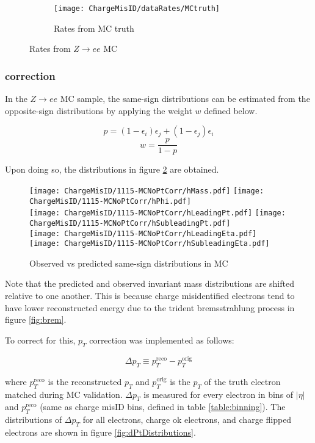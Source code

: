 \begin{figure}[h]
\ContinuedFloat
\centering
\begin{subfigure}[t]{\textwidth}
\centering
\texttt{[image: ChargeMisID/dataRates/MCtruth]}
\caption{Rates from MC truth}
\end{subfigure}
\caption{Rates from $Z\rightarrow ee$ MC}
\label{fig:2DMC}
\end{figure}

\FloatBarrier
\subsubsection*{\pT correction}
In the $Z\rightarrow ee$ MC sample, the same-sign distributions can be estimated from the opposite-sign distributions by applying the weight $w$ defined below.

$$p =(1-\epsilon_i)\epsilon_j + (1-\epsilon_j)\epsilon_i$$
$$w = \frac{p}{1-p}$$

Upon doing so, the distributions in figure \ref{fig:MCdistNoPT} are obtained.

\begin{figure}[h]
\centering
\texttt{[image: ChargeMisID/1115-MCNoPtCorr/hMass.pdf]}
\texttt{[image: ChargeMisID/1115-MCNoPtCorr/hPhi.pdf]}\\
\texttt{[image: ChargeMisID/1115-MCNoPtCorr/hLeadingPt.pdf]}
\texttt{[image: ChargeMisID/1115-MCNoPtCorr/hSubleadingPt.pdf]}\\
\texttt{[image: ChargeMisID/1115-MCNoPtCorr/hLeadingEta.pdf]}
\texttt{[image: ChargeMisID/1115-MCNoPtCorr/hSubleadingEta.pdf]}
\caption{Observed vs predicted same-sign distributions in MC}
\label{fig:MCdistNoPT}
\end{figure}

Note that the predicted and observed invariant mass distributions are shifted relative to one another. This is because charge misidentified electrons tend to have lower reconstructed energy due to the trident bremsstrahlung process in figure \ref{fig:brem}. 

To correct for this, $p_T$ correction was implemented as follows:

$$\Delta p_T \equiv p_T^{\text{reco}} - p_T^{\text{orig}}$$

where $p_T^{\text{reco}}$ is the reconstructed $p_T$ and $p_T^{\text{orig}}$ is the $p_T$ of the truth electron matched during MC validation. $\Delta p_T$ is measured for every electron in bins of $|\eta|$ and $p_T^{\text{reco}}$ (same as charge misID bins, defined in table \ref{table:binning}). The distributions of $\Delta p_T$ for all electrons, charge ok electrons, and charge flipped electrons are shown in figure \ref{fig:dPtDistributions}.


